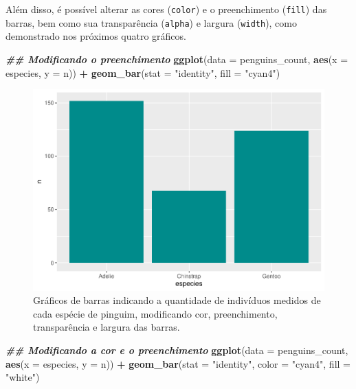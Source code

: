 \documentclass[
]{article}
\newenvironment{Shaded}{\begin{snugshade}}{\end{snugshade}}
\newcommand{\AttributeTok}[1]{\textcolor[rgb]{0.13,0.29,0.53}{#1}}
\newcommand{\DocumentationTok}[1]{\textcolor[rgb]{0.56,0.35,0.01}{\textbf{\textit{#1}}}}
\newcommand{\FunctionTok}[1]{\textcolor[rgb]{0.13,0.29,0.53}{\textbf{#1}}}
\newcommand{\NormalTok}[1]{#1}
\newcommand{\SpecialCharTok}[1]{\textcolor[rgb]{0.81,0.36,0.00}{\textbf{#1}}}
\newcommand{\StringTok}[1]{\textcolor[rgb]{0.31,0.60,0.02}{#1}}
\begin{document}
Além disso, é possível alterar as cores (\texttt{color}) e o preenchimento (\texttt{fill}) das barras, bem como sua transparência (\texttt{alpha}) e largura (\texttt{width}), como demonstrado nos próximos quatro gráficos.

\begin{Shaded}
\begin{Highlighting}[]
\DocumentationTok{\#\# Modificando o preenchimento}
\FunctionTok{ggplot}\NormalTok{(}\AttributeTok{data =}\NormalTok{ penguins\_count, }\FunctionTok{aes}\NormalTok{(}\AttributeTok{x =}\NormalTok{ especies, }\AttributeTok{y =}\NormalTok{ n)) }\SpecialCharTok{+} 
    \FunctionTok{geom\_bar}\NormalTok{(}\AttributeTok{stat =} \StringTok{"identity"}\NormalTok{, }\AttributeTok{fill =} \StringTok{"cyan4"}\NormalTok{)}
\end{Highlighting}
\end{Shaded}

\begin{figure}
\includegraphics[width=0.75\linewidth,height=0.75\textheight]{epr_files/figure-latex/fig-bar-species-color-1} \caption{Gráficos de barras indicando a quantidade de indivíduos medidos de cada espécie de pinguim, modificando cor, preenchimento, transparência e largura das barras.}\label{fig:fig-bar-species-color-1}
\end{figure}

\begin{Shaded}
\begin{Highlighting}[]
\DocumentationTok{\#\# Modificando a cor e o preenchimento}
\FunctionTok{ggplot}\NormalTok{(}\AttributeTok{data =}\NormalTok{ penguins\_count, }\FunctionTok{aes}\NormalTok{(}\AttributeTok{x =}\NormalTok{ especies, }\AttributeTok{y =}\NormalTok{ n)) }\SpecialCharTok{+} 
    \FunctionTok{geom\_bar}\NormalTok{(}\AttributeTok{stat =} \StringTok{"identity"}\NormalTok{, }\AttributeTok{color =} \StringTok{"cyan4"}\NormalTok{, }\AttributeTok{fill =} \StringTok{"white"}\NormalTok{)}
\end{Highlighting}
\end{Shaded}
\end{document}
